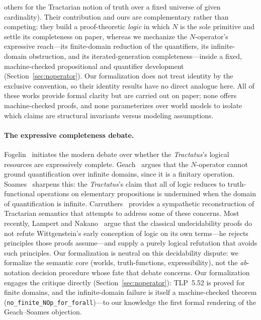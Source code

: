 \documentclass[jsl,bibother]{asl}
\theoremstyle{definition}
\theoremstyle{remark}
\begin{document}
others for the Tractarian notion of truth over a fixed
universe of given cardinality).  Their contribution and ours
are complementary rather than competing: they build a
proof-theoretic \emph{logic} in which $N$ is the sole
primitive and settle its completeness on paper, whereas we
mechanize the $N$-operator's expressive reach---its
finite-domain reduction of the quantifiers, its infinite-domain
obstruction, and its iterated-generation completeness---inside
a fixed, machine-checked propositional and quantifier
development (Section~\ref{sec:noperator}).  Our formalization
does not treat identity by the exclusive convention, so their
identity results have no direct analogue here.
All of these works provide formal clarity but are carried out
on paper; none offers machine-checked proofs, and none
parameterizes over world models to isolate which claims are
structural invariants versus modeling assumptions.

\paragraph{The expressive completeness debate.}
Fogelin~\cite{fogelin1987} initiates the modern debate over
whether the \emph{Tractatus}'s logical resources are
expressively complete.  Geach~\cite{geach1981} argues that the
$N$-operator cannot ground quantification over infinite domains,
since it is a finitary operation.
Soames~\cite{soames1983} sharpens this: the \emph{Tractatus}'s
claim that all of logic reduces to truth-functional operations
on elementary propositions is undermined when the domain of
quantification is infinite.
Carruthers~\cite{carruthers1989} provides a sympathetic
reconstruction of Tractarian semantics that attempts to address
some of these concerns.
Most recently, Lampert and Nakano~\cite{lampert2025} argue that
the classical undecidability proofs do not refute Wittgenstein's
early conception of logic on its own terms---he rejects
principles those proofs assume---and supply a purely logical
refutation that avoids such principles.  Our formalization is
neutral on this decidability dispute: we formalize the semantic
core (worlds, truth-functions, expressibility), not the
\emph{ab}-notation decision procedure whose fate that debate
concerns.
Our formalization engages the critique directly
(Section~\ref{sec:noperator}): TLP~5.52 is proved for finite
domains, and the infinite-domain failure is itself a
machine-checked theorem
(\texttt{no\_finite\_NOp\_for\_forall})---to our knowledge the
first formal rendering of the Geach--Soames objection.
\end{document}

